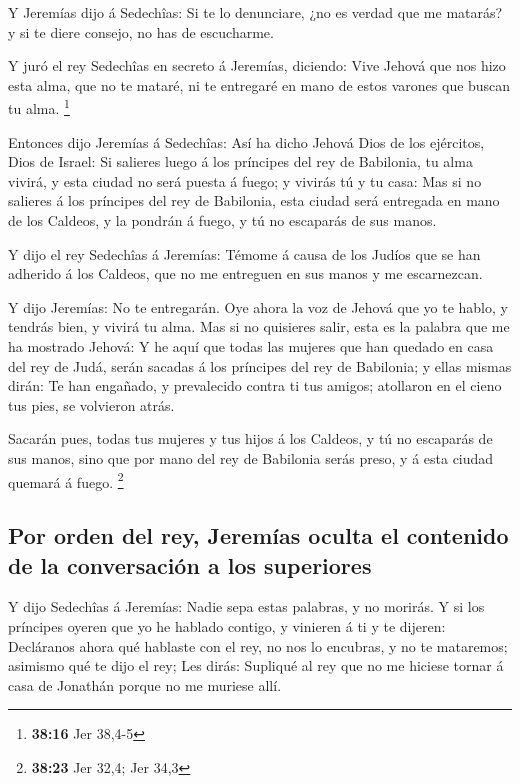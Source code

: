  Y Jeremías dijo á Sedechîas: Si te lo denunciare, ¿no es
verdad que me matarás? y si te diere consejo, no has de escucharme.

 Y juró el rey Sedechîas en secreto á Jeremías, diciendo:
Vive Jehová que nos hizo esta alma, que no te mataré, ni te entregaré en
mano de estos varones que buscan tu alma. \footnote{\textbf{38:16} Jer
  38,4-5}

 Entonces dijo Jeremías á Sedechîas: Así ha dicho Jehová
Dios de los ejércitos, Dios de Israel: Si salieres luego á los príncipes
del rey de Babilonia, tu alma vivirá, y esta ciudad no será puesta á
fuego; y vivirás tú y tu casa:  Mas si no salieres á los
príncipes del rey de Babilonia, esta ciudad será entregada en mano de
los Caldeos, y la pondrán á fuego, y tú no escaparás de sus manos.

 Y dijo el rey Sedechîas á Jeremías: Témome á causa de los
Judíos que se han adherido á los Caldeos, que no me entreguen en sus
manos y me escarnezcan.

 Y dijo Jeremías: No te entregarán. Oye ahora la voz de
Jehová que yo te hablo, y tendrás bien, y vivirá tu alma. 
Mas si no quisieres salir, esta es la palabra que me ha mostrado Jehová:
 Y he aquí que todas las mujeres que han quedado en casa
del rey de Judá, serán sacadas á los príncipes del rey de Babilonia; y
ellas mismas dirán: Te han engañado, y prevalecido contra ti tus amigos;
atollaron en el cieno tus pies, se volvieron atrás.

 Sacarán pues, todas tus mujeres y tus hijos á los Caldeos,
y tú no escaparás de sus manos, sino que por mano del rey de Babilonia
serás preso, y á esta ciudad quemará á fuego. \footnote{\textbf{38:23}
  Jer 32,4; Jer 34,3}

\hypertarget{por-orden-del-rey-jeremuxedas-oculta-el-contenido-de-la-conversaciuxf3n-a-los-superiores}{%
\subsection{Por orden del rey, Jeremías oculta el contenido de la
conversación a los
superiores}\label{por-orden-del-rey-jeremuxedas-oculta-el-contenido-de-la-conversaciuxf3n-a-los-superiores}}

 Y dijo Sedechîas á Jeremías: Nadie sepa estas palabras, y
no morirás.  Y si los príncipes oyeren que yo he hablado
contigo, y vinieren á ti y te dijeren: Decláranos ahora qué hablaste con
el rey, no nos lo encubras, y no te mataremos; asimismo qué te dijo el
rey;  Les dirás: Supliqué al rey que no me hiciese tornar á
casa de Jonathán porque no me muriese allí.

